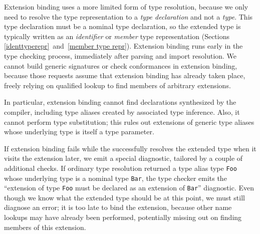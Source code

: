 \documentclass[../generics]{subfiles}
\begin{document}
Extension binding uses a more limited form of type resolution, because we only need to resolve the type representation to a \emph{type declaration} and not a \emph{type}. This type declaration must be a nominal type declaration, so the extended type is typically written as an \emph{identifier} or \emph{member} type representation (Sections \ref{identtyperepr}~and~\ref{member type repr}). Extension binding runs early in the type checking process, immediately after parsing and import resolution. We cannot build generic signatures or check conformances in extension binding, because those requests assume that extension binding has already taken place, freely relying on qualified lookup to find members of arbitrary extensions.

In particular, extension binding cannot find declarations synthesized by the compiler, including type aliases created by associated type inference. Also, it cannot perform type substitution; this rules out extensions of generic type aliases whose underlying type is itself a type parameter.

If extension binding fails while the  successfully resolves the extended type when it visits the extension later, we emit a special diagnostic, tailored by a couple of additional checks. If ordinary type resolution returned a type alias type \texttt{Foo} whose underlying type is a nominal type \texttt{Bar}, the type checker emits the ``extension of type \texttt{Foo} must be declared as an extension of \texttt{Bar}'' diagnostic. Even though we know what the extended type should be at this point, we must still diagnose an error; it is too late to bind the extension, because other name lookups may have already been performed, potentially missing out on finding members of this extension.
\end{document}
